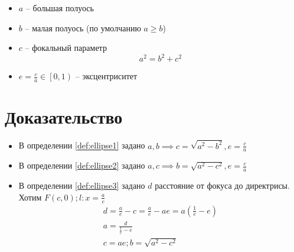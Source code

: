 \begin{itemize}
    \item $a$ -- большая полуось
    \item $b$ -- малая полуось (по умолчанию $a \ge b$)
    \item $c$ -- фокальный параметр \[a^2 = b^2 + c^2\]
    \item $e = \frac{c}{a} \in \left[0, 1\right)$ -- эксцентриситет
\end{itemize}

\section*{Доказательство}
\begin{itemize}
    \item В определении \ref{def:ellipse1} задано $a,b \implies c = \sqrt{a^2 -b^2}, e = \frac{c}{a}$
    \item В определении \ref{def:ellipse2} задано $a,c \implies b = \sqrt{a^2 -c^2}, e = \frac{c}{a}$
    \item В определении \ref{def:ellipse3} задано $d$ расстояние от фокуса до директрисы. Хотим $F(c,0);l:x = \frac{a}{e}$
          \begin{gather*}
              d = \frac{a}{e} -c = \frac{a}{e} - ae = a \left(\frac{1}{e}-e\right)\\
              a = \frac{d}{\frac{1}{e}-e}\\
              c=ae; b = \sqrt{a^2 -c^2}
          \end{gather*}
\end{itemize}

